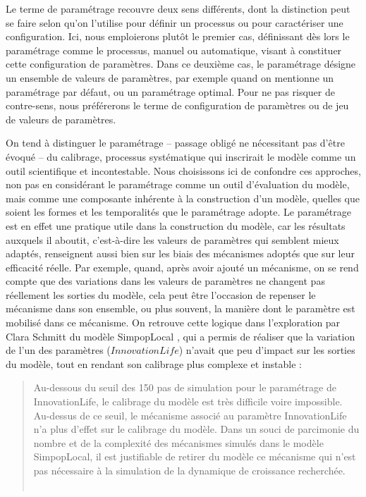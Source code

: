 Le terme de paramétrage recouvre deux sens différents, dont la distinction peut se faire selon qu'on l'utilise pour définir un processus ou pour caractériser une configuration.
Ici, nous emploierons plutôt le premier cas, définissant dès lors le paramétrage comme le processus, manuel ou automatique, visant à constituer cette configuration de paramètres.
Dans ce deuxième cas, le paramétrage désigne un ensemble de valeurs de paramètres, par exemple quand on mentionne un paramétrage par défaut, ou un paramétrage optimal.
Pour ne pas risquer de contre-sens, nous préférerons le terme de configuration de paramètres ou de \og jeu de valeurs de paramètres\fg{}.

On tend à distinguer le paramétrage -- passage obligé ne nécessitant pas d'être évoqué -- du calibrage, processus systématique qui inscrirait le modèle comme un outil scientifique et incontestable.
Nous choisissons ici de confondre ces approches, non pas en considérant le paramétrage comme un outil d'évaluation du modèle, mais comme une composante inhérente à la construction d'un modèle, quelles que soient les formes et les temporalités que le paramétrage adopte.
Le paramétrage est en effet une pratique utile dans la construction du modèle, car les résultats auxquels il aboutit, c'est-à-dire les valeurs de paramètres qui semblent mieux adaptés, renseignent aussi bien sur les biais des mécanismes adoptés que sur leur efficacité réelle.
Par exemple, quand, après avoir ajouté un mécanisme, on se rend compte que des variations dans les valeurs de paramètres ne changent pas réellement les sorties du modèle, cela peut être l'occasion de repenser le mécanisme dans son ensemble, ou plus souvent, la manière dont le paramètre est mobilisé dans ce mécanisme.
On retrouve cette logique dans l'exploration par Clara Schmitt du modèle SimpopLocal \autocite{schmitt_modelisation_2014}, qui a permis de réaliser que la variation de l'un des paramètres ($InnovationLife$) n'avait que peu d'impact sur les sorties du modèle, tout en rendant son calibrage plus complexe et instable :
\begin{quotation}
\noindent\og
	Au-dessous du seuil des 150 pas de simulation pour le paramétrage de InnovationLife, le calibrage du modèle est très difficile voire impossible.
	Au-dessus de ce seuil, le mécanisme associé au paramètre InnovationLife n'a plus d'effet sur le calibrage du modèle.
	Dans un souci de parcimonie du nombre et de la complexité des mécanismes simulés dans le modèle SimpopLocal, il est justifiable de retirer du modèle ce mécanisme qui n'est pas nécessaire à la simulation de la dynamique de croissance recherchée.
	\fg{}\\
	\mbox{}~ \hfill \textcite[224]{schmitt_modelisation_2014}
\end{quotation}

